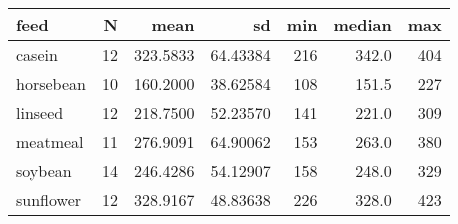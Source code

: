 
\begin{tabular}[t]{lrrrrrr}
\toprule
feed & N & mean & sd & min & median & max\\
\midrule
casein & 12 & 323.5833 & 64.43384 & 216 & 342.0 & 404\\
horsebean & 10 & 160.2000 & 38.62584 & 108 & 151.5 & 227\\
linseed & 12 & 218.7500 & 52.23570 & 141 & 221.0 & 309\\
meatmeal & 11 & 276.9091 & 64.90062 & 153 & 263.0 & 380\\
soybean & 14 & 246.4286 & 54.12907 & 158 & 248.0 & 329\\
\addlinespace
sunflower & 12 & 328.9167 & 48.83638 & 226 & 328.0 & 423\\
\bottomrule
\end{tabular}
